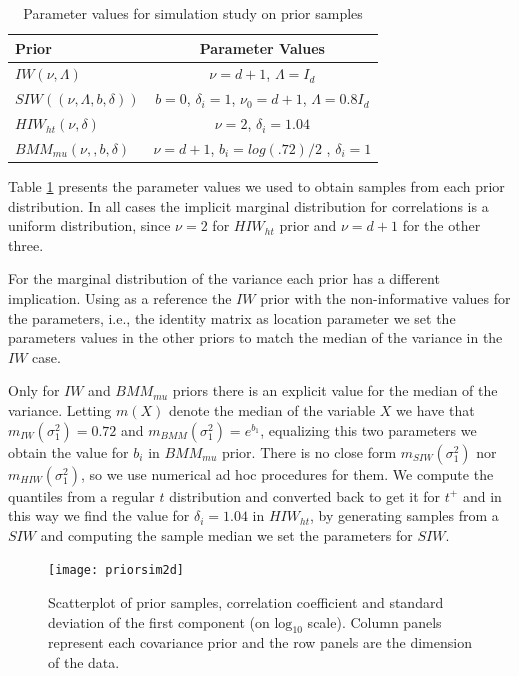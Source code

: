 \documentclass{article}
\begin{document}
\begin{table}[htbp]
   \centering
    \caption{ Parameter values for simulation study on prior samples}
   \label{paramvals} 
   \begin{tabular}{ l|c}
   \hline
      Prior    &  Parameter Values \\ \hline
  $IW(\nu, \Lambda)$ &   $\nu=d+1$, $\Lambda=I_d$ \\ 
  $SIW((\nu, \Lambda, b, \delta))$  & $b=0$, $\delta_i =1$,  $\nu_0= d + 1$, $\Lambda = 0.8I_d$ \\
  $HIW_{ht}(\nu, \delta)$    &  $\nu=2$,  $\delta_i=1.04$ \\
   $BMM_{mu}(\nu,,b,\delta)$   &  $\nu=d+1$, $b_i=log(.72)/2$ , $\delta_i=1$ \\ \hline
   \end{tabular}
 \end{table}       

Table \ref{paramvals} presents the parameter values we used to obtain samples from each prior distribution. In all cases the implicit marginal distribution for correlations is a uniform distribution, since $\nu=2$ for $HIW_{ht}$ prior and $\nu=d+1$ for the other three. 

 For the marginal distribution of the variance each prior has a different implication. Using as a reference the $IW$ prior with the non-informative values for the parameters, i.e., the identity matrix as location parameter we set the parameters values in the other priors to match the median of the variance in the $IW$ case.  

Only for $IW$ and $BMM_{mu}$ priors there is an explicit value for the median of the variance. Letting $m(X)$ denote the median of the variable $X$ we have that  $m_{IW}(\sigma_1^2) = 0.72$ and $m_{BMM}(\sigma_1^2) = e^{b_1}$, equalizing this two parameters we obtain the value for $b_i$ in $BMM_{mu}$ prior. 
There is no close form $m_{SIW}(\sigma_1^2)$  nor $m_{HIW}(\sigma_1^2)$, so we use numerical ad hoc procedures for them. We compute the quantiles from a regular $t$ distribution and converted back to get it for $t^{+}$ and in this way we find the value for $\delta_i=1.04$ in $HIW_{ht}$, by generating samples from a $SIW$ and computing the sample median we set the parameters for $SIW$. 

\begin{figure}[htbp]
\begin{center}
 \texttt{[image: priorsim2d]} 
 \vspace{-.5in}
\caption{Scatterplot of prior samples, correlation coefficient and standard deviation of the first component (on $\mbox{log}_{10}$ scale). Column panels represent each covariance prior and the row panels are the dimension of the data.  \label{priorF1}}
\end{center}
\end{figure}
\end{document}
